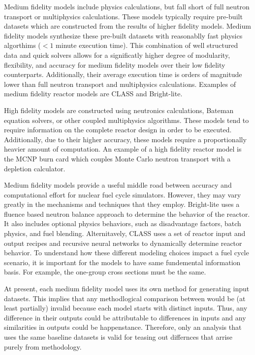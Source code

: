 \documentclass{article}
\begin{document}
Medium fidelity models include physics calculations, but fall short of
full neutron transport or multiphysics calculations. These models typically require
pre-built datasets which are constructed from the results of higher fidelity models.
Medium fidelity models synthesize these pre-built datasets with reasonablly fast physics
algorthims ($<1$ minute execution time). This combination of well structured data and
quick solvers allows for a significatly higher degree of modularity, flexibility, and accuracy
for medium fidelity models over their low fidelity counterparts. Additionally, their average
execution time is orders of magnitude lower than full neutron transport and multiphysics
calculations. Examples of medium fidelity reactor models are CLASS\cite{class}
and Bright-lite\cite{brightlite}.

High fidelity models are constructed using neutronics calculations, Bateman
equation solvers\cite{bateman1910, bateman}, or other coupled multiphysics algorithms. These models tend
to require information on the complete reactor design in order to be executed.
Additionally, due to their higher accuracy, these models require a proportionally heavier amount
of computation. An example of a high fidelity reactor model is the
MCNP\cite{mcnp5monte} burn card which couples Monte Carlo neutron transport with a depletion
calculator.

Medium fidelity models provide a useful middle road between accuracy and computational effort
for nuclear fuel cycle simulators. However, they may vary greatly in the mechanisms and
techniques that they employ. Bright-lite uses a fluence based neutron balance approach to
determine the behavior of the reactor. It also includes optional physics behaviors, such as
disadvantage factors, batch physics, and fuel blending. Alternitavely, CLASS uses a set of
reactor input and output recipes and recursive neural networks\cite{classneural} to dynamically determine
reactor behavior. To understand how these different modeling choices impact a fuel cycle
scenario, it is important for the models to have same fundemental information basis.
For example, the one-group cross sections must be the same.

At present, each medium fidelity model uses its own method for generating input datasets.
This implies that any methodlogical comparison between would be (at least partially) invalid
because each model starts with distinct inputs. Thus, any difference in their outputs
could be attributable to differences in inputs and any similarities in outputs could be
happenstance. Therefore, only an analysis that uses the same baseline datasets
is valid for teasing out differnces that arrise purely from methodology.
\end{document}
